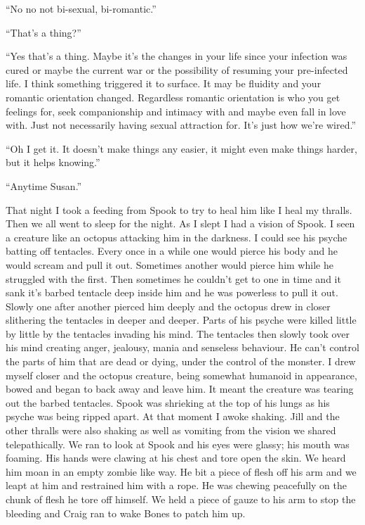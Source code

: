 ``No no not bi-sexual, bi-romantic.''

``That's a thing?''

``Yes that's a thing. Maybe it's the changes in your life since your infection was cured or maybe the current war or the possibility of resuming your pre-infected life. I think something triggered it to surface. It may be fluidity and your romantic orientation changed. Regardless romantic orientation is who you get feelings for, seek companionship and intimacy with and maybe even fall in love with. Just not necessarily having sexual attraction for. It's just how we're wired.''

``Oh I get it. It doesn't make things any easier, it might even make things harder, but it helps knowing.''

``Anytime Susan.''

That night I took a feeding from Spook to try to heal him like I heal my thralls. 
Then we all went to sleep for the night. As I slept I had a vision of Spook. I seen a creature like an octopus attacking him in the darkness. I could see his psyche batting off tentacles. Every once in a while one would pierce his body and he would scream and pull it out. Sometimes another would pierce him while he struggled with the first. Then sometimes he couldn't get to one in time and it sank it's barbed tentacle deep inside him and he was powerless to pull it out. Slowly one after another pierced him deeply and the octopus drew in closer slithering the tentacles in deeper and deeper. Parts of his psyche were killed little by little by the tentacles invading his mind. The tentacles then slowly took over his mind creating anger, jealousy, mania and senseless behaviour. He can't control the parts of him that are dead or dying, under the control of the monster. I drew myself closer and the octopus creature, being somewhat humanoid in appearance, bowed and began to back away and leave him. It meant the creature was tearing out the barbed tentacles. Spook was shrieking at the top of his lungs as his psyche was being ripped apart. 
At that moment I awoke shaking. Jill and the other thralls were also shaking as well as vomiting from the vision we shared telepathically. We ran to look at Spook and his eyes were glassy; his mouth was foaming. His hands were clawing at his chest and tore open the skin. We heard him moan in an empty zombie like way. He bit a piece of flesh off his arm and we leapt at him and restrained him with a rope. He was chewing peacefully on the chunk of flesh he tore off himself. We held a piece of gauze to his arm to stop the bleeding and Craig ran to wake Bones to patch him up.

